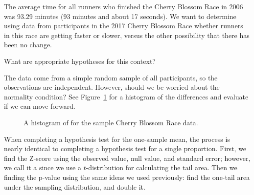 The average time for all runners who finished the Cherry Blossom Race in 2006 was 93.29 minutes (93 minutes and about 17 seconds). We want to determine using data from \cherryblossomn{} participants in the 2017 Cherry Blossom Race whether runners in this race are getting faster or slower, versus the other possibility that there has been no change.

\begin{exercisewrap}
\begin{nexercise}
What are appropriate hypotheses for this context?\footnotemark{}
\end{nexercise}
\end{exercisewrap}

\begin{exercisewrap}
\begin{nexercise}
The data come from a simple random sample of all participants,
so the observations are independent.
However, should we be worried about the normality condition?
See Figure~\ref{run10SampTimeHistogram} for a histogram
of the differences and evaluate if we can move
forward.\footnotemark{}
\end{nexercise}
\end{exercisewrap}

\begin{figure}[h]
  \centering
  \caption{A histogram of  for the sample
      Cherry Blossom Race data.}
  \label{run10SampTimeHistogram}
\end{figure}

When completing a hypothesis test for the one-sample mean,
the process is nearly identical to completing a hypothesis
test for a single proportion.
First, we find the Z-score using the observed value,
null value, and standard error;
however, we call it a  since we use
a $t$-distribution for calculating the tail area.
Then we finding the p-value using the same ideas we used
previously: find the one-tail area under the sampling
distribution, and double it.


